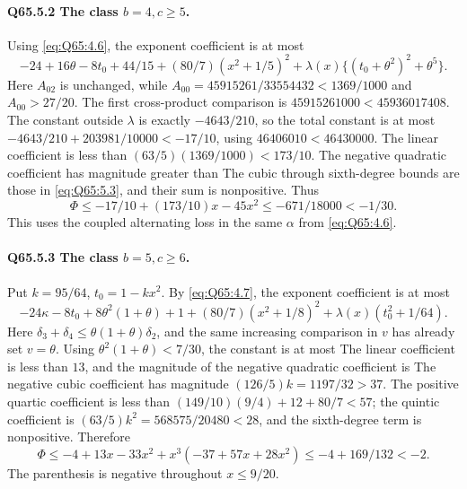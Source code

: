 \paragraph{Q65.5.2 The class \(b=\allowbreak 4,\allowbreak c\ge\allowbreak 5\).}
Using \eqref{eq:Q65:4.6}, the exponent coefficient is at most
\begin{equation}\tag{Q65.5.5}\label{eq:Q65:5.5}
-24+16\theta-8t_0+44/15+(80/7)(x^2+1/5)^2
 +\lambda(x)\{(t_0+\theta^2)^2+\theta^5\}.
\end{equation}
Here \(A_{02}\) is unchanged, while
\(A_{00}=\allowbreak 45915261/33554432<\allowbreak 1369/1000\) and \(A_{00}>\allowbreak 27/20\).
The first cross-product comparison is
\(45915261000<\allowbreak 45936017408\).
The constant outside \(\lambda\) is exactly \(-4643/210\), so the
total constant is at most
\(-4643/210+203981/10000<\allowbreak -17/10\), using
\(46406010<\allowbreak 46430000\).
The linear coefficient is less than \((63/5)(1369/1000)<\allowbreak 173/10\).
The negative quadratic coefficient has magnitude greater than
The cubic through sixth-degree bounds are those in
\eqref{eq:Q65:5.3}, and their sum is nonpositive. Thus
\begin{equation}\tag{Q65.5.6}\label{eq:Q65:5.6}
\Phi\le-17/10+(173/10)x-45x^2
 \le-671/18000<-1/30.
\end{equation}
This uses the coupled alternating loss in the same \(\alpha\)
from \eqref{eq:Q65:4.6}.

\paragraph{Q65.5.3 The class \(b=\allowbreak 5,\allowbreak c\ge\allowbreak 6\).}
Put \(k=\allowbreak 95/64\), \(t_0=\allowbreak 1-kx^2\). By \eqref{eq:Q65:4.7},
the exponent coefficient is at most
\begin{equation}\tag{Q65.5.7}\label{eq:Q65:5.7}
-24\kappa-8t_0+8\theta^2(1+\theta)+1
 +(80/7)(x^2+1/8)^2+\lambda(x)(t_0^2+1/64).
\end{equation}
Here \(\delta_3+\delta_4\le\allowbreak \theta(1+\theta)\delta_2\), and the
same increasing comparison in \(v\) has already set \(v=\allowbreak \theta\).
Using \(\theta^2(1+\theta)<\allowbreak 7/30\), the constant is at most
The linear coefficient is less than \(13\), and the magnitude of the
negative quadratic coefficient is
The negative cubic coefficient has magnitude
\((126/5)k=\allowbreak 1197/32>\allowbreak 37\). The positive quartic coefficient is less
than \((149/10)(9/4)+12+80/7<\allowbreak 57\); the quintic coefficient is
\((63/5)k^2=\allowbreak 568575/20480<\allowbreak 28\), and the sixth-degree term is nonpositive.
Therefore
\begin{equation}\tag{Q65.5.8}\label{eq:Q65:5.8}
\Phi\le-4+13x-33x^2+x^3(-37+57x+28x^2)
 \le-4+169/132<-2.
\end{equation}
The parenthesis is negative throughout \(x\le\allowbreak 9/20\).

